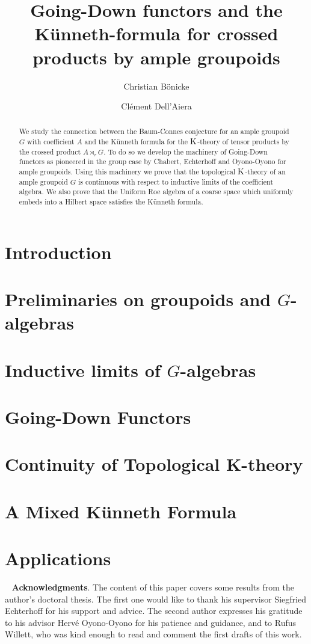 \documentclass[reqno,oneside,a4paper,11pt]{amsart}
\title[Going-Down functors and the K\"unneth-formula]{\texorpdfstring{Going-Down functors and the Künneth-formula for crossed products by ample groupoids}{Going-Down functors and the Künneth-formula for crossed products by ample groupoids}}
\author{Christian B\"onicke}
\author{Clément Dell'Aiera}
\begin{document}
\maketitle
\begin{abstract}
		We study the connection between the Baum-Connes conjecture for an ample groupoid $G$ with coefficient $A$ and the Künneth formula for the $\mathrm K$-theory of tensor products by the crossed product $A\rtimes_r G$. To do so we develop the machinery of Going-Down functors as pioneered in the group case by Chabert, Echterhoff and Oyono-Oyono for ample groupoids. Using this machinery we prove that the topological $\mathrm K$-theory of an ample groupoid $G$ is continuous with respect to inductive limits of the coefficient algebra. We also prove that the Uniform Roe algebra of a coarse space which uniformly embeds into a Hilbert space satisfies the Künneth formula.
\end{abstract}

\section{Introduction}
	

\section{Preliminaries on groupoids and $G$-algebras}


\section{Inductive limits of $G$-algebras}

	
\section{Going-Down Functors}

	
\section{Continuity of Topological K-theory}

	
\section{A Mixed Künneth Formula}
	
	
\section{Applications}

	
	\ \newline
	{\bf Acknowledgments}. The content of this paper covers some results from the author's doctoral thesis. The first one would like to thank his supervisor Siegfried Echterhoff for his support and advice. The second author expresses his gratitude to his advisor Hervé Oyono-Oyono for his patience and guidance, and to Rufus Willett, who was kind enough to read and comment the first drafts of this work. 
	


\end{document}
